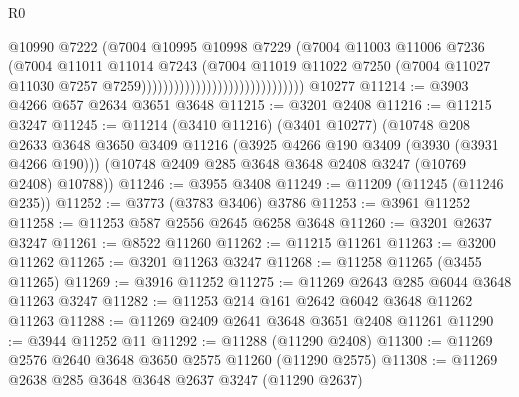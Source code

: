 \begin{lexlean}{R0}
\begin{coremodule}
                                                      @10990
                                                      @7222
                                                      (@7004
                                                        @10995
                                                        @10998
                                                        @7229
                                                        (@7004
                                                          @11003
                                                          @11006
                                                          @7236
                                                          (@7004
                                                            @11011
                                                            @11014
                                                            @7243
                                                            (@7004
                                                              @11019
                                                              @11022
                                                              @7250
                                                              (@7004
                                                                @11027
                                                                @11030
                                                                @7257
                                                                @7259))))))))))))))))))))))))))))))
    @10277
@11214 := @3903 @4266 @657 @2634 @3651 @3648
@11215 := @3201 @2408
@11216 := @11215 @3247
@11245 := @11214
    (@3410 @11216)
    (@3401 @10277)
    (@10748
      @208
      @2633
      @3648
      @3650
      @3409
      @11216
      (@3925 @4266 @190 @3409 (@3930 (@3931 @4266 @190)))
      (@10748 @2409 @285 @3648 @3648 @2408 @3247 (@10769 @2408) @10788))
@11246 := @3955 @3408
@11249 := @11209 (@11245 (@11246 @235))
@11252 := @3773 (@3783 @3406) @3786
@11253 := @3961 @11252
@11258 := @11253 @587 @2556 @2645 @6258 @3648
@11260 := @3201 @2637 @3247
@11261 := @8522 @11260
@11262 := @11215 @11261
@11263 := @3200 @11262
@11265 := @3201 @11263 @3247
@11268 := @11258 @11265 (@3455 @11265)
@11269 := @3916 @11252
@11275 := @11269 @2643 @285 @6044 @3648 @11263 @3247
@11282 := @11253 @214 @161 @2642 @6042 @3648 @11262 @11263
@11288 := @11269 @2409 @2641 @3648 @3651 @2408 @11261
@11290 := @3944 @11252 @11
@11292 := @11288 (@11290 @2408)
@11300 := @11269 @2576 @2640 @3648 @3650 @2575 @11260 (@11290 @2575)
@11308 := @11269 @2638 @285 @3648 @3648 @2637 @3247 (@11290 @2637)

\end{coremodule}
\end{lexlean}
